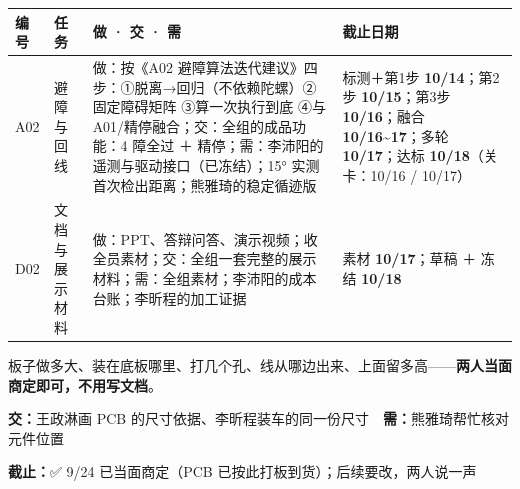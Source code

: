 \documentclass[10.5pt]{article}
\begin{document}
\vspace{5pt}{\bfseries 毕烨恺 —— A02 · D02}\par\vspace{2pt}
{\small
\begin{longtable}{@{}L{1.0cm}L{2.3cm}L{9.7cm}L{4.8cm}@{}}
\toprule
\textbf{编号} & \textbf{任务} & \textbf{做 · 交 · 需} & \textbf{截止日期}\tabularnewline
\midrule
\endhead
A02 & 避障与回线 & 做：按《A02 避障算法迭代建议》四步：①脱离→回归（不依赖陀螺）②固定障碍矩阵 ③算一次执行到底 ④与 A01/精停融合；交：全组的成品功能：4 障全过 ＋ 精停；需：李沛阳的遥测与驱动接口（已冻结）；15° 实测首次检出距离；熊雅琦的稳定循迹版 & 标测＋第1步 \textbf{10/14}；第2步 \textbf{10/15}；第3步 \textbf{10/16}；融合 \textbf{10/16\textasciitilde{}17}；多轮 \textbf{10/17}；达标 \textbf{10/18}（关卡：10/16 / 10/17）\tabularnewline
D02 & 文档与展示材料 & 做：PPT、答辩问答、演示视频；收全员素材；交：全组一套完整的展示材料；需：全组素材；李沛阳的成本台账；李昕程的加工证据 & 素材 \textbf{10/17}；草稿 ＋ 冻结 \textbf{10/18}\tabularnewline
\bottomrule
\end{longtable}

}

\vspace{6pt}{\bfseries 共同任务：车架与 PCB 的尺寸与孔位（王政淋 + 李昕程，熊雅琦辅助核对）}\par\vspace{3pt}
板子做多大、装在底板哪里、打几个孔、线从哪边出来、上面留多高——\textbf{两人当面商定即可，不用写文档}。\par\vspace{2pt}
\textbf{交：}王政淋画 PCB 的尺寸依据、李昕程装车的同一份尺寸　\textbf{需：}熊雅琦帮忙核对元件位置\par\vspace{2pt}
\textbf{截止：}✅ 9/24 已当面商定（PCB 已按此打板到货）；后续要改，两人说一声\par
\end{document}
